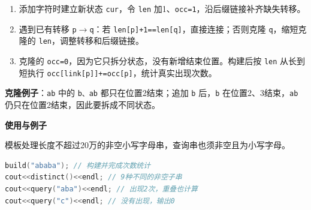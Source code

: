 \documentclass[10pt,landscape,a4paper]{article}
\begin{document}
\begin{multicols*}{3}
\begin{enumerate}[start=1]
\item 添加字符时建立新状态 \texttt{c\allowbreak{}u\allowbreak{}r}，令 \texttt{l\allowbreak{}e\allowbreak{}n} 加1、\texttt{o\allowbreak{}c\allowbreak{}c\allowbreak{}=\allowbreak{}1}，沿后缀链接补齐缺失转移。
\item 遇到已有转移 \texttt{p\allowbreak{}\ensuremath{\to}\allowbreak{}q}：若 \texttt{l\allowbreak{}e\allowbreak{}n\allowbreak{}[\allowbreak{}p\allowbreak{}]\allowbreak{}+\allowbreak{}1\allowbreak{}=\allowbreak{}=\allowbreak{}l\allowbreak{}e\allowbreak{}n\allowbreak{}[\allowbreak{}q\allowbreak{}]}，直接连接；否则克隆 \texttt{q}，缩短克隆的 \texttt{l\allowbreak{}e\allowbreak{}n}，调整转移和后缀链接。
\item 克隆的 \texttt{o\allowbreak{}c\allowbreak{}c\allowbreak{}=\allowbreak{}0}，因为它只拆分状态，没有新增结束位置。构建后按 \texttt{l\allowbreak{}e\allowbreak{}n} 从长到短执行 \texttt{o\allowbreak{}c\allowbreak{}c\allowbreak{}[\allowbreak{}l\allowbreak{}i\allowbreak{}n\allowbreak{}k\allowbreak{}[\allowbreak{}p\allowbreak{}]\allowbreak{}]\allowbreak{}+\allowbreak{}=\allowbreak{}o\allowbreak{}c\allowbreak{}c\allowbreak{}[\allowbreak{}p\allowbreak{}]}，统计真实出现次数。
\end{enumerate}
\textbf{克隆例子}：\texttt{a\allowbreak{}b} 中的 \texttt{b\allowbreak{}、\allowbreak{}a\allowbreak{}b} 都只在位置2结束；追加 \texttt{b} 后，\texttt{b} 在位置2、3结束，\texttt{a\allowbreak{}b} 仍只在位置2结束，因此要拆成不同状态。\par
\par\addvspace{0.7ex}\noindent\textbf{使用与例子}\par\nobreak
模板处理长度不超过20万的非空小写字母串，查询串也须非空且为小写字母。\par
\begin{lstlisting}[language=C++,numbers=none,basicstyle=\footnotesize\ttfamily]
build("ababa"); // 构建并完成次数统计
cout<<distinct()<<endl; // 9种不同的非空子串
cout<<query("aba")<<endl; // 出现2次，重叠也计算
cout<<query("c")<<endl; // 没有出现，输出0
\end{lstlisting}


\end{multicols*}
\end{document}

